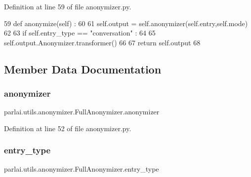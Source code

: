 Definition at line 59 of file anonymizer.\+py.


\begin{DoxyCode}
59     \textcolor{keyword}{def }anonymize(self) : 
60 
61         self.output = self.anonymizer(self.entry,self.mode)
62 
63         \textcolor{keywordflow}{if} self.entry\_type == \textcolor{stringliteral}{"conversation"} : 
64 
65             self.output.Anonymizer.transformer()
66 
67             \textcolor{keywordflow}{return} self.output
68 
\end{DoxyCode}


\subsection{Member Data Documentation}
\mbox{\label{classparlai_1_1utils_1_1anonymizer_1_1FullAnonymizer_a70fcdf554f74a86b63ef8950241f813e}} 
\subsubsection{\texorpdfstring{anonymizer}{anonymizer}}
{\footnotesize\ttfamily parlai.\+utils.\+anonymizer.\+Full\+Anonymizer.\+anonymizer}



Definition at line 52 of file anonymizer.\+py.

\mbox{\label{classparlai_1_1utils_1_1anonymizer_1_1FullAnonymizer_a95080b7f5bd386981a082671431df555}} 
\subsubsection{\texorpdfstring{entry\+\_\+type}{entry\_type}}
{\footnotesize\ttfamily parlai.\+utils.\+anonymizer.\+Full\+Anonymizer.\+entry\+\_\+type}



